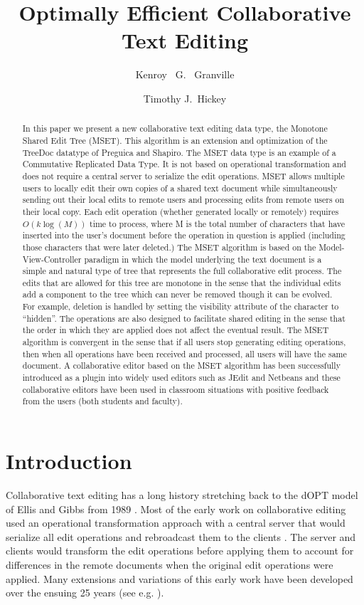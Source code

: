 \documentclass{amsart}
\title{Optimally Efficient Collaborative Text Editing}
\author{
Kenroy~ G.~ Granville
\and 
Timothy J.~Hickey 
}
\begin{document}
\maketitle

\begin{abstract}
In this paper we present a new collaborative text editing data type,  
the Monotone Shared Edit Tree (MSET). This algorithm is an extension
and optimization of the TreeDoc datatype of Preguica and Shapiro.  The MSET data type is an example of
a Commutative Replicated Data Type. It is not based on operational transformation 
and does not require a central server to serialize the
edit operations.
MSET allows multiple users to locally 
edit their own copies of a shared text document
while simultaneously sending out their local edits 
to remote users and processing edits from remote users 
on their local copy.
Each edit operation (whether generated locally or remotely) 
requires $O(k\log(M))$ time to process, where
M is the total number of characters that have inserted 
into the user's document before the operation in
question is applied (including those characters that were later deleted.)
The MSET algorithm is based on 
the Model-View-Controller paradigm in which the
model underlying the text document is a simple and 
natural type of tree that represents the full collaborative edit process.
The edits that are allowed for this tree are monotone in the sense that
the individual edits add a component to the tree which can never be removed
though it can be evolved. For example, deletion is handled by setting the
visibility attribute of the character to ``hidden''. The operations are also
designed to facilitate shared editing in the sense that the order in which
they are applied does not affect the eventual result.
The MSET algorithm is convergent in the sense that 
if all users stop generating
editing operations, then when all operations have 
been received and processed, all users will have
the same document. 
A collaborative editor based on the MSET algorithm 
has been successfully introduced as a plugin into widely used
editors such as JEdit and Netbeans and 
these collaborative editors have been used in classroom situations
with positive feedback from the users (both students and faculty).
\end{abstract}
\newpage
\tableofcontents
\newpage

\section{Introduction}
Collaborative text editing has a long history stretching back to the dOPT model of Ellis and Gibbs from 1989 \cite{ellis_concurrency_1989}. Most of the early work on collaborative editing used an operational transformation approach with a central server that would serialize all edit operations and rebroadcast them to the clients \cite{nichols_high-latency_1995}. The server and clients would transform the edit operations before applying them to account for differences in the remote documents when the original edit operations were applied. Many extensions and variations of this early work have been developed over the ensuing 25 years (see e.g. \cite{sun_operational_2004}).
\end{document}
